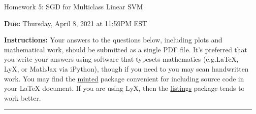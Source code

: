 \documentclass{article}
\newcommand{\ruleskip}{\bigskip\hrule\bigskip}
\theoremstyle{plain}
\theoremstyle{definition}
\begin{document}

\pagestyle{myheadings} 

\begin{center}
{\Large
Homework 5: SGD for Multiclass Linear SVM
} 
\end{center}

{
{ \color{nyupurple} \textbf{Due:} Thursday, April 8, 2021 at 11:59PM EST} 
} 

\textbf{Instructions: }Your answers to the questions below, including plots and mathematical
 work, should be submitted as a single PDF file.  It's preferred that you write your answers using software that typesets mathematics (e.g.LaTeX, LyX, or MathJax via iPython), though if you need to you may scan handwritten work.  You may find the \href{https://github.com/gpoore/minted}{minted} package convenient for including source code in your LaTeX document.  If you are using LyX, then the \href{https://en.wikibooks.org/wiki/LaTeX/Source_Code_Listings}{listings} package tends to work better.

\ruleskip

\end{document}
